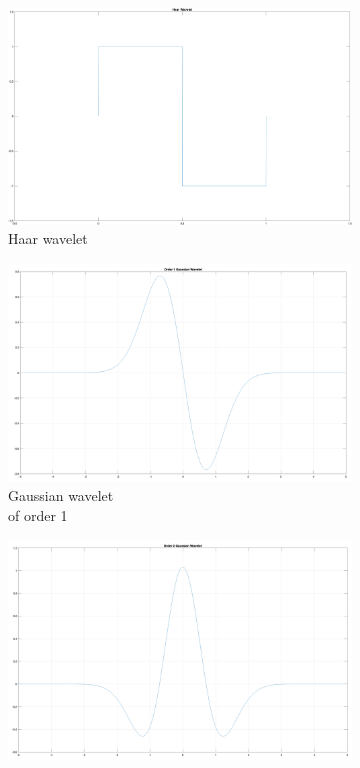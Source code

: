 \begin{enumerate}
    \begin{figure}
        \centering
        \begin{subfigure}{.4\textwidth}
          \centering
          \includegraphics[width=\linewidth]{Figures/haar.png}
          \caption{Haar wavelet}
          \label{Haar}
        \end{subfigure}
        \hfill
        \begin{subfigure}{.4\textwidth}
            \centering
            \includegraphics[width=\linewidth]{Figures/order1gaussian.png}
            \caption{Gaussian wavelet \\of order 1}
            \label{order1}
        \end{subfigure}
        \hfill
        \begin{subfigure}{.4\textwidth}
          \centering
          \includegraphics[width=\linewidth]{Figures/order2gaussian.png}

\end{subfigure}
\end{figure}
\end{enumerate}
